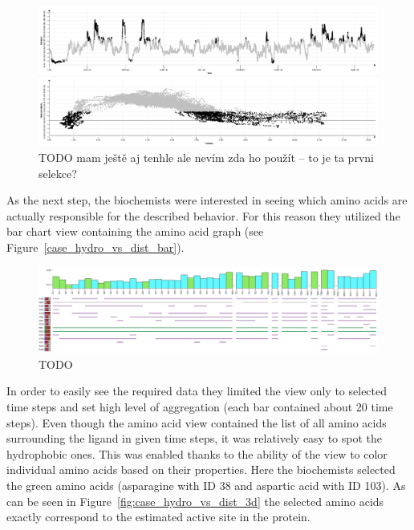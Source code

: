 \documentclass[twocolumn]{bmcart}%
\begin{document}
\begin{figure}[htb]
	\centering
  \includegraphics[width=0.95\linewidth]{img/case_hydro_distance_2_orig.png}
  \caption{\label{fig:case_hydro_distance_3} {\color{red}TODO} mam ještě aj tenhle ale nevím zda ho použít -- to je ta prvni selekce?}
\end{figure}

As the next step, the biochemists were interested in seeing which amino acids are actually responsible for the described behavior.
For this reason they utilized the bar chart view containing the amino acid graph (see Figure~\ref{case_hydro_vs_dist_bar}).

\begin{figure}[htb]
	\centering
  \includegraphics[width=0.95\linewidth]{img/case_hydro_vs_dist_bar.png}
  \caption{\label{fig:case_hydro_vs_dist_bar} {\color{red}TODO}}
\end{figure}


In order to easily see the required data they limited the view only to selected time steps and set high level of aggregation (each bar contained about 20 time steps).
Even though the amino acid view contained the list of all amino acids surrounding the ligand in given time steps, it was relatively easy to spot the hydrophobic ones.
This was enabled thanks to the ability of the view to color individual amino acids based on their properties. 
Here the biochemists selected the green amino acids (asparagine with ID 38 and aspartic acid with ID 103). 
As can be seen in Figure~\ref{fig:case_hydro_vs_dist_3d} the selected amino acids exactly correspond to the estimated active site in the protein.
\end{document}
